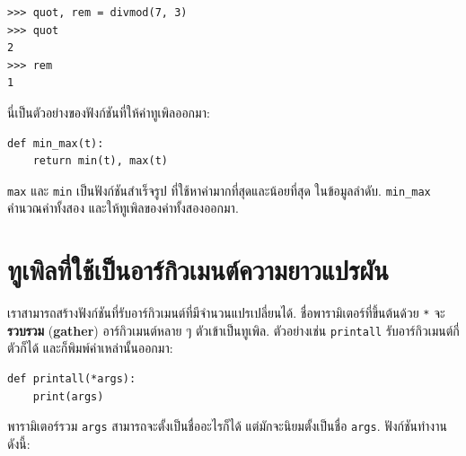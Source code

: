 \begin{verbatim}
>>> quot, rem = divmod(7, 3)
>>> quot
2
>>> rem
1
\end{verbatim}
%
นี่เป็นตัวอย่างของฟังก์ชันที่ให้ค่าทูเพิลออกมา:

\begin{verbatim}
def min_max(t):
    return min(t), max(t)
\end{verbatim}
%
\texttt{max} และ \texttt{min} เป็นฟังก์ชันสำเร็จรูป
ที่ใช้หาค่ามากที่สุดและน้อยที่สุด ในข้อมูลลำดับ.
\verb|min_max| คำนวณค่าทั้งสอง และให้ทูเพิลของค่าทั้งสองออกมา.

\section{ทูเพิลที่ใช้เป็นอาร์กิวเมนต์ความยาวแปรผัน}
\label{gather}


เราสามารถสร้างฟังก์ชันที่รับอาร์กิวเมนต์ที่มีจำนวนแปรเปลี่ยนได้.
ชื่อพารามิเตอร์ที่ขึ้นต้นด้วย \texttt{*} จะ\textbf{รวบรวม} (\textbf{gather}) อาร์กิวเมนต์หลาย ๆ ตัวเข้าเป็นทูเพิล.
ตัวอย่างเช่น \texttt{printall} รับอาร์กิวเมนต์กี่ตัวก็ได้ และก็พิมพ์ค่าเหล่านั้นออกมา:


\begin{verbatim}
def printall(*args):
    print(args)
\end{verbatim}
%
พารามิเตอร์รวม \texttt{args} สามารถจะตั้งเป็นชื่ออะไรก็ได้ แต่มักจะนิยมตั้งเป็นชื่อ \texttt{args}.  
ฟังก์ชันทำงานดังนี้:

